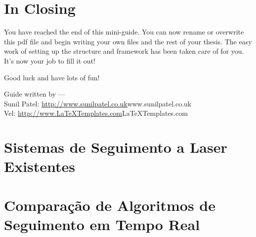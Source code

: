 
\section{In Closing}

You have reached the end of this mini-guide. You can now rename or overwrite this pdf file and begin writing your own  files and the rest of your thesis. The easy work of setting up the structure and framework has been taken care of for you. It's now your job to fill it out!

Good luck and have lots of fun!

\begin{flushright}
Guide written by ---\\
Sunil Patel: \url{http://www.sunilpatel.co.uk}{www.sunilpatel.co.uk}\\
Vel: \url{http://www.LaTeXTemplates.com}{LaTeXTemplates.com}
\end{flushright}


\section{Sistemas de Seguimento a Laser Existentes}

\section{Comparação de Algoritmos de Seguimento em Tempo Real}
